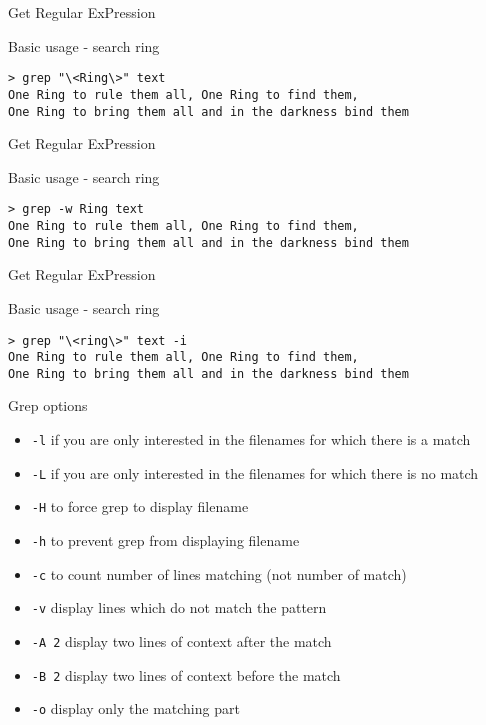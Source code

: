 \begin{frame}[fragile]{Get Regular ExPression}
  \begin{exampleblock}{Basic usage - search ring}
    \begin{lstlisting}[showstringspaces=false,basicstyle=\tiny]
> grep "\<Ring\>" text
One Ring to rule them all, One Ring to find them,
One Ring to bring them all and in the darkness bind them
    \end{lstlisting}
  \end{exampleblock}
\end{frame}


\begin{frame}[fragile]{Get Regular ExPression}
  \begin{exampleblock}{Basic usage - search ring}
    \begin{lstlisting}[showstringspaces=false,basicstyle=\tiny]
> grep -w Ring text
One Ring to rule them all, One Ring to find them,
One Ring to bring them all and in the darkness bind them
    \end{lstlisting}
  \end{exampleblock}
\end{frame}


\begin{frame}[fragile]{Get Regular ExPression}
  \begin{exampleblock}{Basic usage - search ring}
    \begin{lstlisting}[showstringspaces=false,basicstyle=\tiny]
> grep "\<ring\>" text -i
One Ring to rule them all, One Ring to find them,
One Ring to bring them all and in the darkness bind them
    \end{lstlisting}
  \end{exampleblock}
\end{frame}


\begin{frame}[fragile]{Grep options}
  \begin{itemize}
    \item \texttt{-l} if you are only interested in the filenames for which there is a match
    \pause \item \texttt{-L} if you are only interested in the filenames for which there is no match
    \pause \item \texttt{-H} to force grep to display filename
    \pause \item \texttt{-h} to prevent grep from displaying filename
    \pause \item \texttt{-c} to count number of lines matching (not number of match)
    \pause \item \texttt{-v} display lines which do not match the pattern
    \pause \item \texttt{-A 2} display two lines of context after the match
    \pause \item \texttt{-B 2} display two lines of context before the match
    \pause \item \texttt{-o} display only the matching part 
  \end{itemize}
\end{frame}



